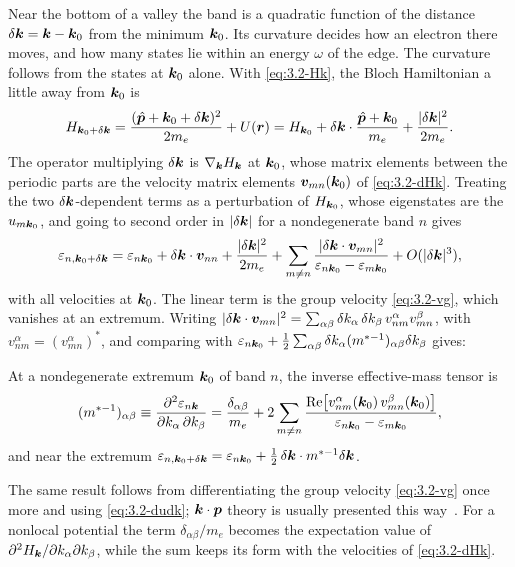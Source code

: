 Near the bottom of a valley the band is a quadratic function of the distance $\delta\bm{k} = \bm{k} - \bm{k}_0$ from the minimum $\bm{k}_0$. Its curvature decides how an electron there moves, and how many states lie within an energy $\omega$ of the edge. The curvature follows from the states at $\bm{k}_0$ alone. With \cref{eq:3.2-Hk}, the Bloch Hamiltonian a little away from $\bm{k}_0$ is
\begin{equation*}
  H_{\bm{k}_0+\delta\bm{k}} = \frac{(\hat{\bm{p}} + \bm{k}_0 + \delta\bm{k})^2}{2m_e} + U(\bm{r})
  = H_{\bm{k}_0} + \delta\bm{k}\cdot\frac{\hat{\bm{p}} + \bm{k}_0}{m_e} + \frac{|\delta\bm{k}|^2}{2m_e} .
\end{equation*}
The operator multiplying $\delta\bm{k}$ is $\nabla_{\bm{k}}H_{\bm{k}}$ at $\bm{k}_0$, whose matrix elements between the periodic parts are the velocity matrix elements $\bm{v}_{mn}(\bm{k}_0)$ of \cref{eq:3.2-dHk}. Treating the two $\delta\bm{k}$-dependent terms as a perturbation of $H_{\bm{k}_0}$, whose eigenstates are the $u_{m\bm{k}_0}$, and going to second order in $|\delta\bm{k}|$ for a nondegenerate band $n$ gives
\begin{equation}
  \varepsilon_{n,\bm{k}_0+\delta\bm{k}} = \varepsilon_{n\bm{k}_0} + \delta\bm{k}\cdot\bm{v}_{nn} + \frac{|\delta\bm{k}|^2}{2m_e}
  + \sum_{m\neq n}\frac{|\delta\bm{k}\cdot\bm{v}_{mn}|^2}{\varepsilon_{n\bm{k}_0} - \varepsilon_{m\bm{k}_0}} + O(|\delta\bm{k}|^3) ,
  \label{eq:3.3-kp}
\end{equation}
with all velocities at $\bm{k}_0$. The linear term is the group velocity \cref{eq:3.2-vg}, which vanishes at an extremum. Writing $|\delta\bm{k}\cdot\bm{v}_{mn}|^2 = \sum_{\alpha\beta}\delta k_\alpha\,\delta k_\beta\,v^\alpha_{nm}v^\beta_{mn}$, with $v^\alpha_{nm} = (v^\alpha_{mn})^*$, and comparing with $\varepsilon_{n\bm{k}_0} + \frac12\sum_{\alpha\beta}\delta k_\alpha(m^{*-1})_{\alpha\beta}\delta k_\beta$ gives:
\begin{keyresult}
At a nondegenerate extremum $\bm{k}_0$ of band $n$, the inverse effective-mass tensor is
\begin{equation}
  (m^{*-1})_{\alpha\beta} \equiv \frac{\partial^2\varepsilon_{n\bm{k}}}{\partial k_\alpha\,\partial k_\beta}
  = \frac{\delta_{\alpha\beta}}{m_e} + 2\sum_{m\neq n}\frac{\operatorname{Re}\bigl[v^\alpha_{nm}(\bm{k}_0)\,v^\beta_{mn}(\bm{k}_0)\bigr]}{\varepsilon_{n\bm{k}_0} - \varepsilon_{m\bm{k}_0}} ,
  \label{eq:3.3-mass}
\end{equation}
and near the extremum $\varepsilon_{n,\bm{k}_0+\delta\bm{k}} = \varepsilon_{n\bm{k}_0} + \frac12\,\delta\bm{k}\cdot m^{*-1}\delta\bm{k}$.
\end{keyresult}
The same result follows from differentiating the group velocity \cref{eq:3.2-vg} once more and using \cref{eq:3.2-dudk}; $\bm{k}\cdot\bm{p}$ theory is usually presented this way~\cite[Chap.~2]{yu2010fundamentals}. For a nonlocal potential the term $\delta_{\alpha\beta}/m_e$ becomes the expectation value of $\partial^2H_{\bm{k}}/\partial k_\alpha\partial k_\beta$, while the sum keeps its form with the velocities of \cref{eq:3.2-dHk}.

